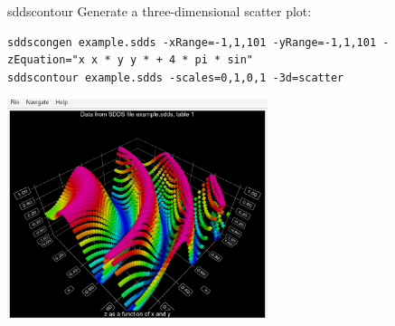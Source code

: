 \begin{sddsprog}{sddscontour}
    Generate a three-dimensional scatter plot:
    \begin{verbatim}
sddscongen example.sdds -xRange=-1,1,101 -yRange=-1,1,101 -zEquation="x x * y y * + 4 * pi * sin"
sddscontour example.sdds -scales=0,1,0,1 -3d=scatter
    \end{verbatim}
    \centerline{\includegraphics[width=3in]{3D-scatter-plot.eps}}


\end{sddsprog}
